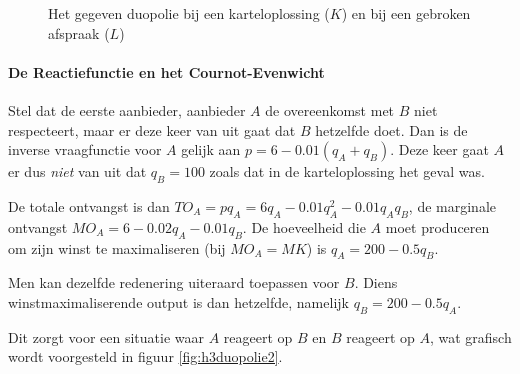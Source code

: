 \begin{figure}[H]
\vspace{0.5cm}
\centering
\captionsetup{justification=centering,margin=2cm}
\caption{Het gegeven duopolie bij een karteloplossing ($K$) en bij een gebroken afspraak ($L$)}
\label{fig:h3duopolie}
\end{figure}

\paragraph{De Reactiefunctie en het Cournot-Evenwicht}

Stel dat de eerste aanbieder, aanbieder $A$ de overeenkomst met $B$ niet respecteert, maar er deze keer van uit gaat dat $B$ hetzelfde doet. Dan is de inverse vraagfunctie voor $A$ gelijk aan $p=6-0.01(q_A+q_B)$. Deze keer gaat $A$ er dus \textit{niet} van uit dat $q_B=100$ zoals dat in de karteloplossing het geval was.
\par De totale ontvangst is dan $TO_A=pq_A=6q_A-0.01q_A^2-0.01q_Aq_B$, de marginale ontvangst $MO_A=6-0.02q_A-0.01q_B$. De hoeveelheid die $A$ moet produceren om zijn winst te maximaliseren (bij $MO_A=MK$) is $q_A=200-0.5q_B$.\\

\par Men kan dezelfde redenering uiteraard toepassen voor $B$. Diens winstmaximaliserende output is dan hetzelfde, namelijk $q_B=200-0.5q_A$.
\par Dit zorgt voor een situatie waar $A$ reageert op $B$ en $B$ reageert op $A$, wat grafisch wordt voorgesteld in figuur \ref{fig:h3duopolie2}.

